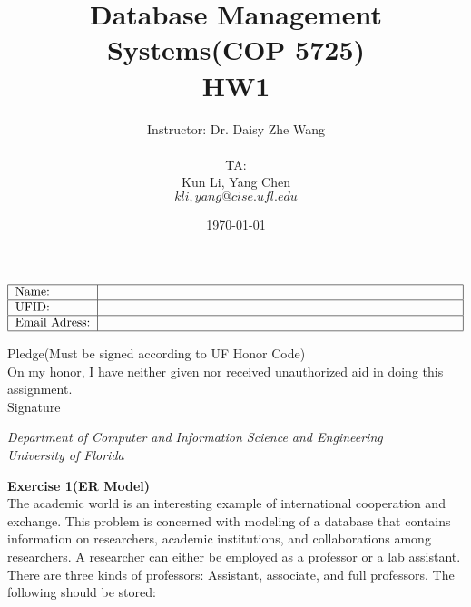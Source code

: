 \documentclass[12pt]{article}
\begin{document}

\title{Database Management Systems(COP 5725) \\ HW1}%
\author{Instructor: Dr. Daisy Zhe Wang\\\\
TA:\\ 
Kun Li, Yang Chen\\ 
${kli,yang}@cise.ufl.edu$\\
} %

\date{\today}
\maketitle


\begin {table}[h]
\[\begin{tabular}{|l|p{10cm}|} \hline
  Name: & \\ \hline
  UFID: & \\ \hline
  Email Adress: & \\ 
  \hline  
\end{tabular}\]
\end{table}

\linespread{2}
\noindent
Pledge(Must be signed according to UF Honor Code)\\
On my honor, I have neither given nor received unauthorized aid in doing this
assignment.\\

Signature \underline{\hspace{5cm}}

\null
\vfill
\begin{center}
\large \emph{Department of Computer and Information Science and Engineering}\\
\Large \emph{University of Florida}
\end{center}


\newpage
\textbf{Exercise 1(ER Model)}\\

The academic world is an interesting example of international cooperation and exchange.
This problem is concerned with modeling of a database that contains information on researchers, academic institutions, and collaborations among researchers. A researcher can
either be employed as a professor or a lab assistant. There are three kinds of professors:
Assistant, associate, and full professors. The following should be stored:
\end{document}

